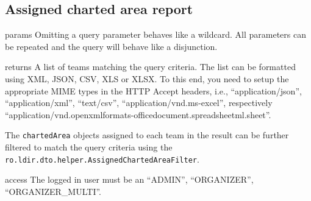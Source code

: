 \subsection{Assigned charted area report}

\begin{apidata}{params}
  Omitting a query parameter behaves like a wildcard. All parameters can be
  repeated and the query will behave like a disjunction.
\end{apidata}
\begin{apidata}{returns}
  A list of teams matching the query criteria. The list can be formatted using
  XML, JSON, CSV, XLS or XLSX. To this end, you need to setup the appropriate
  MIME types in the HTTP Accept headers, i.e., ``application/json'',
  ``application/xml'', ``text/csv'', ``application/vnd.ms-excel'', respectively
  ``application/vnd.openxmlformats-officedocument.spreadsheetml.sheet''.

  The \texttt{chartedArea} objects assigned to each team in the result can be
  further filtered to match the query criteria using the
  \texttt{ro.ldir.dto.helper.AssignedChartedAreaFilter}. 
\end{apidata}
\begin{apidata}{access}
The logged in user must be an ``ADMIN'', ``ORGANIZER'', ``ORGANIZER\_MULTI''. 
\end{apidata}


